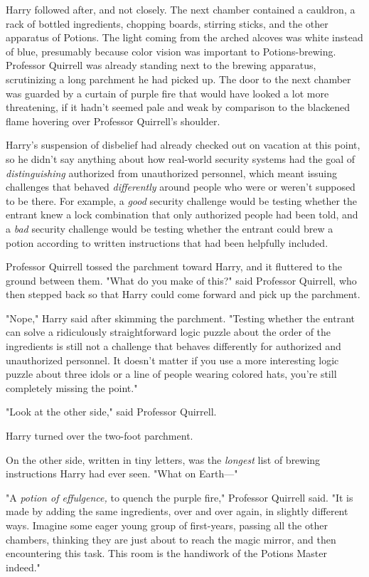 Harry followed after, and not closely.
\sbreak
The next chamber contained a cauldron, a rack of bottled ingredients, chopping
boards, stirring sticks, and the other apparatus of Potions. The light coming
from the arched alcoves was white instead of blue, presumably because color
vision was important to Potions-brewing. Professor Quirrell was already
standing next to the brewing apparatus, scrutinizing a long parchment he had
picked up. The door to the next chamber was guarded by a curtain of purple fire
that would have looked a lot more threatening, if it hadn't seemed pale and
weak by comparison to the blackened flame hovering over Professor Quirrell's
shoulder.

Harry's suspension of disbelief had already checked out on vacation at this
point, so he didn't say anything about how real-world security systems had the
goal of \emph{distinguishing} authorized from unauthorized personnel, which
meant issuing challenges that behaved \emph{differently} around people who were
or weren't supposed to be there. For example, a \emph{good} security challenge
would be testing whether the entrant knew a lock combination that only
authorized people had been told, and a \emph{bad} security challenge would be
testing whether the entrant could brew a potion according to written
instructions that had been helpfully included.

Professor Quirrell tossed the parchment toward Harry, and it fluttered to the
ground between them. "What do you make of this?" said Professor Quirrell, who
then stepped back so that Harry could come forward and pick up the parchment.

"Nope," Harry said after skimming the parchment. "Testing whether the entrant
can solve a ridiculously straightforward logic puzzle about the order of the
ingredients is still not a challenge that behaves differently for authorized
and unauthorized personnel. It doesn't matter if you use a more interesting
logic puzzle about three idols or a line of people wearing colored hats, you're
still completely missing the point."

"Look at the other side," said Professor Quirrell.

Harry turned over the two-foot parchment.

On the other side, written in tiny letters, was the \emph{longest} list of
brewing instructions Harry had ever seen. "What on Earth---"

"A \emph{potion of effulgence,} to quench the purple fire," Professor Quirrell
said. "It is made by adding the same ingredients, over and over again, in
slightly different ways. Imagine some eager young group of first-years, passing
all the other chambers, thinking they are just about to reach the magic mirror,
and then encountering this task. This room is the handiwork of the Potions
Master indeed."


